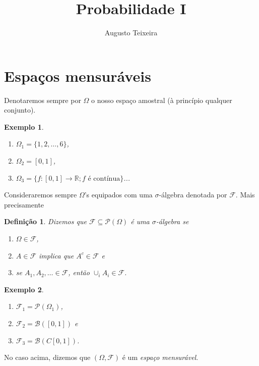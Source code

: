 \documentclass[reqno]{article}
\newcommand*\1{\mathds{1}}
\newtheorem{definition}[theorem]{Definição}
\newtheorem{example}{Exemplo}[section]
\begin{document}
\title{Probabilidade I}
\author{Augusto Teixeira}

\maketitle

\tableofcontents

\section{Espaços mensuráveis}


Denotaremos sempre por $\Omega$ o nosso espaço amostral (à princípio qualquer conjunto).

\begin{example} \mbox{}
  \begin{enumerate}
  \item $\Omega_1 = \{1, 2, \dots, 6\}$,
  \item $\Omega_2 = [0,1]$,
  \item $\Omega_3 = \{f:[0,1] \to \mathbb{R}; \text{$f$ é contínua}\}$...
  \end{enumerate}
\end{example}

Consideraremos sempre $\Omega$'s equipados com uma $\sigma$-álgebra denotada por $\mathcal{F}$.
Mais precisamente
\begin{definition}
  Dizemos que $\mathcal{F} \subseteq \mathcal{P}(\Omega)$ é uma $\sigma$-álgebra se
  \begin{enumerate}
  \item $\Omega \in \mathcal{F}$,
  \item $A \in \mathcal{F}$ implica que $A^c \in \mathcal{F}$ e
  \item se $A_1, A_2, \dots \in \mathcal{F}$, então $\cup_i A_i \in \mathcal{F}$.
  \end{enumerate}
\end{definition}

\begin{example} \mbox{}
  \begin{enumerate}
  \item $\mathcal{F}_1 = \mathcal{P}(\Omega_1)$,
  \item $\mathcal{F}_2 = \mathcal{B}([0,1])$ e
  \item $\mathcal{F}_3 = \mathcal{B}(C[0,1])$.
  \end{enumerate}
\end{example}

No caso acima, dizemos que $(\Omega, \mathcal{F})$ é um \emph{espaço mensurável}.
\end{document}
